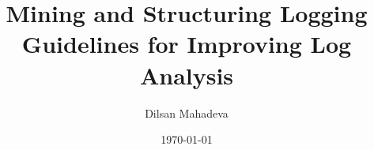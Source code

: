 \setcounter{tocdepth}{3}  %
\setcounter{secnumdepth}{3} %

\usepackage[utf8]{inputenc} %
\usepackage[T1]{fontenc}
\usepackage[english]{babel} %
\usepackage{lmodern}

\usepackage{tikz} %
\usetikzlibrary{arrows.meta}
\usepackage{tikz}
\usepackage{pgfplots}
\pgfplotsset{compat=1.18}

\usepackage{float}
\usepackage{placeins}

\usepackage{booktabs}
\usepackage{tabularx}
\usepackage{array}
\usepackage{ragged2e}
\usepackage{longtable}

\usepackage{pdfpages}


\author{Dilsan Mahadeva}
\title{Mining and Structuring Logging Guidelines for Improving Log Analysis}
\date{\today}

\usepackage[style=numeric,sorting=none,giveninits=false,natbib=true,backend=biber,maxbibnames=99,language=autobib,date=long]{biblatex}




\usepackage{eso-pic}
\usepackage{color}
\newcommand{\setrubfontnormal}[1]{\fontfamily{rubscala}\fontsize{#1}{1}\selectfont}
\newcommand{\setrubfontextra}[1]{\fontfamily{rubflama}\fontsize{#1}{1}\selectfont}

\usepackage{graphicx}

\usepackage{booktabs}
\usepackage{marvosym}
\usepackage{multirow}

\usepackage{amsmath, amssymb, amsfonts}

\usepackage[babel,english=american, german=quotes]{csquotes}

\usepackage{fontawesome5}

\usepackage[cache=false]{minted}


